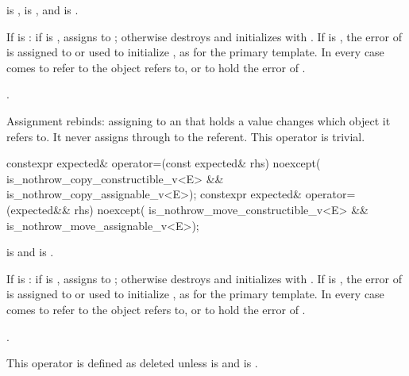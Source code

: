 \begin{itemdescr}
\pnum
\constraints
{} is ,  is , and  is .

\pnum
\effects
If  is : if  is , assigns  to ; otherwise destroys  and initializes  with . If  is , the error of  is assigned to or used to initialize , as for the primary template. In every case  comes to refer to the object  refers to, or to hold the error of .

\pnum
\returns
{}.

\pnum
\remarks
Assignment rebinds: assigning to an  that holds a value changes which object it refers to. It never assigns through to the referent. This operator is trivial.
\end{itemdescr}

%
\begin{itemdecl}
constexpr expected& operator=(const expected& rhs) noexcept(
    is_nothrow_copy_constructible_v<E> && is_nothrow_copy_assignable_v<E>);
constexpr expected& operator=(expected&& rhs) noexcept(
    is_nothrow_move_constructible_v<E> && is_nothrow_move_assignable_v<E>);
\end{itemdecl}

\begin{itemdescr}
\pnum
\constraints
{} is  and  is .

\pnum
\effects
If  is : if  is , assigns  to ; otherwise destroys  and initializes  with . If  is , the error of  is assigned to or used to initialize , as for the primary template. In every case  comes to refer to the object  refers to, or to hold the error of .

\pnum
\returns
{}.

\pnum
\remarks
This operator is defined as deleted unless  is  and  is .
\end{itemdescr}

